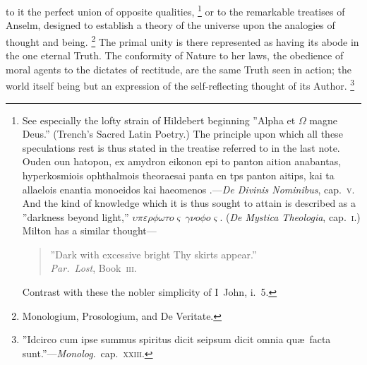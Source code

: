 \documentclass[oneside]{book}
\begin{document}
to it the perfect union of opposite qualities,%
\footnote{See especially the lofty strain of Hildebert beginning ''Alpha et $\Omega$ magne
Deus.'' (Trench's Sacred Latin Poetry.) The principle upon which all these
speculations rest is thus stated in the treatise referred to in the last note.
%
%
\textgreek{ Ouden oun hatopon, ex amydron eikonon epi to panton
aition anabantas, hyperkosmiois
 ophthalmois theoraesai panta en tps panton aitips, kai ta allaelois enantia
 monoeidos kai haeomenos}
.---\textit{De Divinis Nominibus}, cap.~\textsc{v}. And the kind of
knowledge which it is thus sought to attain is described as a ''darkness beyond
light,''
$\upsilon\pi\varepsilon\rho\phi\omega\tau o\varsigma\ \gamma\nu o\phi o\varsigma$.
%
%
(\textit{De Mystica Theologia}, cap.~\textsc{i}.) Milton has a similar
thought---
\begin{quote}
{\centering ''Dark with excessive bright Thy skirts appear.''}\\
\hfill \textit{Par.~Lost}, Book~\textsc{iii}.
\end{quote}
Contrast with these the nobler simplicity of I~John, i.~5.
}%
 or to the remarkable
treatises of Anselm, designed to establish a theory of the universe
upon the analogies of thought and being.%
\footnote{Monologium, Prosologium, and De Veritate.}
 The primal unity is
there represented as having its abode in the one eternal Truth.
The conformity of Nature to her laws, the obedience of moral
agents to the dictates of rectitude, are the same Truth seen in
action; the world itself being but an expression of the self-reflecting
thought of its Author.%
\footnote{''Idcirco cum ipse summus spiritus dicit seipsum dicit omnia qu\ae\ facta
sunt.''---\textit{Monolog}.~cap.~\textsc{xxiii}.
}%
\end{document}
